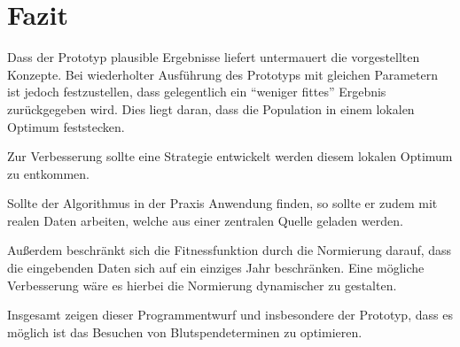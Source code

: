 \section{Fazit}\label{sec:fazit}
Dass der Prototyp plausible Ergebnisse liefert untermauert die vorgestellten Konzepte.
Bei wiederholter Ausführung des Prototyps mit gleichen Parametern ist jedoch festzustellen,
dass gelegentlich ein \enquote{weniger fittes} Ergebnis zurückgegeben wird.
Dies liegt daran, dass die Population in einem lokalen Optimum feststecken.

Zur Verbesserung sollte eine Strategie entwickelt werden diesem lokalen Optimum zu entkommen.

Sollte der Algorithmus in der Praxis Anwendung finden,
so sollte er zudem mit realen Daten arbeiten, welche aus einer zentralen Quelle geladen werden.

Außerdem beschränkt sich die Fitnessfunktion durch die Normierung darauf,
dass die eingebenden Daten sich auf ein einziges Jahr beschränken.
Eine mögliche Verbesserung wäre es hierbei die Normierung dynamischer zu gestalten.

Insgesamt zeigen dieser Programmentwurf und insbesondere der Prototyp,
dass es möglich ist das Besuchen von Blutspendeterminen zu optimieren.
